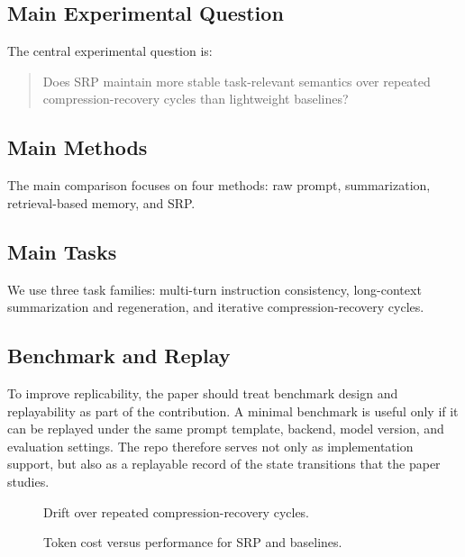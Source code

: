 \documentclass[11pt]{article}
\begin{document}
\subsection{Main Experimental Question}

The central experimental question is:

\begin{quote}
Does SRP maintain more stable task-relevant semantics over repeated compression-recovery cycles than lightweight baselines?
\end{quote}

\subsection{Main Methods}

The main comparison focuses on four methods: raw prompt, summarization, retrieval-based memory, and SRP.

\subsection{Main Tasks}

We use three task families: multi-turn instruction consistency, long-context summarization and regeneration, and iterative compression-recovery cycles.

\subsection{Benchmark and Replay}

To improve replicability, the paper should treat benchmark design and replayability as part of the contribution. A minimal benchmark is useful only if it can be replayed under the same prompt template, backend, model version, and evaluation settings. The repo therefore serves not only as implementation support, but also as a replayable record of the state transitions that the paper studies.

\begin{figure}[t]
  \centering
  \caption{Drift over repeated compression-recovery cycles.}
  \label{fig:drift}
\end{figure}

\begin{figure}[t]
  \centering
  \caption{Token cost versus performance for SRP and baselines.}
  \label{fig:tradeoff}
\end{figure}
\end{document}
